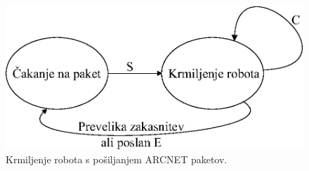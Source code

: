 \begin{figure}[!h]
	\centering
	\includegraphics[scale=0.5]{./Slike/pa10-control-state.eps}
	\caption{Krmiljenje robota s po\v{s}iljanjem ARCNET paketov.}
	\label{fig:pa10-control-state}
\end{figure}
